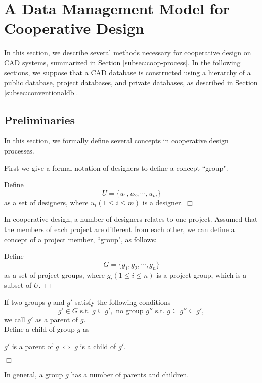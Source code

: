 \section{A Data Management Model for Cooperative Design}
\label{sec:dmm}
In this section, we describe several methods necessary for 
cooperative design on CAD systems,
summarized in Section \ref{subsec:coop-process}.
In the following sections, we suppose that a CAD database is 
constructed using a hierarchy
of a public database, project databases, and private databases, as
described in Section \ref{subsec:conventionaldb}.

\subsection{Preliminaries}
\label{subsec:prelim}
In this section, we formally define several concepts in cooperative design
processes.


First we give a formal notation of designers to define a concept
``group".
\begin{definition} \label{def:users}
Define \[ U=\{u_{1}, u_{2}, \cdots, u_{m}\} \] as a set of designers, where
$u_i (1 \leq i \leq m)$ is a designer. \hfill$\Box$
\end{definition}

In cooperative design, a number of designers relates to one project.
Assumed that the members of each project are different from each other,
we can define a concept of a project member, ``group",  as follows:
\begin{definition} \label{def:groups}
Define \[ G = \{g_1, g_2, \cdots, g_n\} \] as a set of project groups,
where $g_i (1 \leq i \leq n)$ is a project group, which is a subset of
$U$. \hfill$\Box$
\end{definition}

\begin{definition} \label{def:parent}
If two groups $g$ and $g'$ satisfy the following conditions
\[ g' \in G \mbox{ s.t. } g \subseteq g', 
\mbox{ no group } g'' \mbox{ s.t. } g \subseteq g'' \subseteq g', \] 
we call $g'$ as a parent of $g$.\\
Define a child of group $g$ as
\begin{center}
$g'$ is a parent of $g$ $\iff$ $g$ is a child of $g'$.
\end{center}\hfill$\Box$
\end{definition}
In general, a group $g$ has a number of parents and children.

